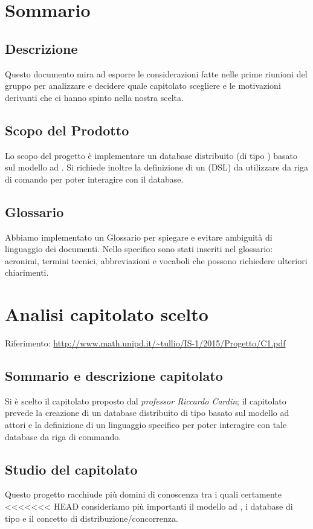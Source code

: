 \documentclass{scalatekids-article}
\begin{document}
\section{Sommario}
\subsection{Descrizione}
Questo documento mira ad esporre le considerazioni fatte nelle prime riunioni
del gruppo per analizzare e decidere quale capitolato scegliere e le motivazioni
derivanti che ci hanno spinto nella nostra scelta.

\subsection{Scopo del Prodotto}
Lo scopo del progetto è implementare un database  distribuito (di
tipo ) basato sul modello ad . Si richiede inoltre
la definizione di un  (DSL) da utilizzare da riga
di comando per poter interagire con il database.
\subsection{Glossario}
Abbiamo implementato un Glossario per spiegare e evitare ambiguità di
linguaggio dei documenti. Nello specifico sono stati inseriti nel glossario:
acronimi, termini tecnici, abbreviazioni e vocaboli che possono richiedere
ulteriori chiarimenti.

\section{Analisi capitolato scelto}

Riferimento: \url{http://www.math.unipd.it/~tullio/IS-1/2015/Progetto/C1.pdf}\\

\subsection{Sommario e descrizione capitolato}
Si è scelto il capitolato proposto dal \textit{professor Riccardo Cardin}; il capitolato
prevede la creazione di un database  distribuito di tipo  basato
sul modello ad attori e la definizione di un linguaggio specifico per poter
interagire con tale database da riga di commando.

\subsection{Studio del capitolato}
Questo progetto racchiude più domini di conoscenza tra i quali certamente
<<<<<<< HEAD
consideriamo più importanti il modello ad , i database di tipo
 e il concetto di distribuzione/concorrenza.
\end{document}
